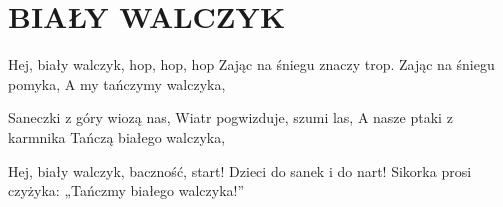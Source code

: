 \documentclass[../../../songbook.tex]{subfiles}
\begin{document}
\TabPositions{8cm} %
\section*{BIAŁY WALCZYK}
{}
\vspace{0.5cm}
Hej, biały walczyk, hop, hop, hop 		 \newline	 
Zając na śniegu znaczy trop. 			 \newline	 
Zając na śniegu pomyka, 				 \newline	 
A my tańczymy walczyka, 				 \newline	 

Saneczki z góry wiozą nas, 			 \newline
Wiatr pogwizduje, szumi las, 	 \newline		
A nasze ptaki z karmnika 	 \newline		
Tańczą białego walczyka,  \newline			

Hej, biały walczyk, baczność, start!  \newline	
Dzieci do sanek i do nart! 		 \newline	
Sikorka prosi czyżyka: 		 \newline		
„Tańczmy białego walczyka!”	 \newline		
\end{document}
